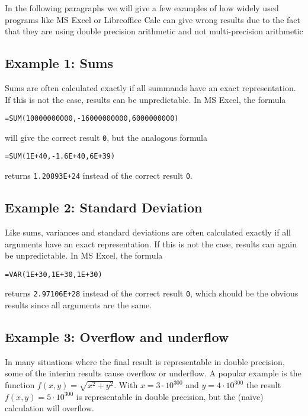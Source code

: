 In the following paragraphs we will give a few examples of how widely used programs like MS Excel or Libreoffice Calc can give wrong results due to the fact that they are using double precision arithmetic and not multi-precision arithmetic

\subsection{Example 1: Sums}

Sums are often calculated exactly if all summands have an exact representation. If this is not the case, results can be unpredictable. In MS Excel, the formula

\begin{verbatim}
=SUM(10000000000,-16000000000,6000000000)
\end{verbatim}
 will give the correct result  \verb|0|, but the analogous formula
 \begin{verbatim}
=SUM(1E+40,-1.6E+40,6E+39)
 \end{verbatim}
returns \verb|1.20893E+24| instead of the correct result \verb|0|.

\subsection{Example 2: Standard Deviation}
Like sums, variances and standard deviations are often calculated exactly if all arguments have an exact representation. If this is not the case, results can again be unpredictable. In MS Excel, the formula
 \begin{verbatim}
=VAR(1E+30,1E+30,1E+30)
 \end{verbatim}
returns \verb|2.97106E+28| instead of the correct result \verb|0|, which should be the obvious results since all arguments are the same.


\subsection{Example 3: Overflow and underflow}

In many situations where the final result is representable in double precision, some of the interim results cause overflow or underflow. A popular example is the function $f(x,y) = \sqrt{x^2+y^2}$. With $x=3 \cdot 10^{300}$ and $y=4 \cdot 10^{300}$ the result $f(x,y) = 5 \cdot 10^{300}$ is representable in double precision, but the (naive) calculation will overflow.




